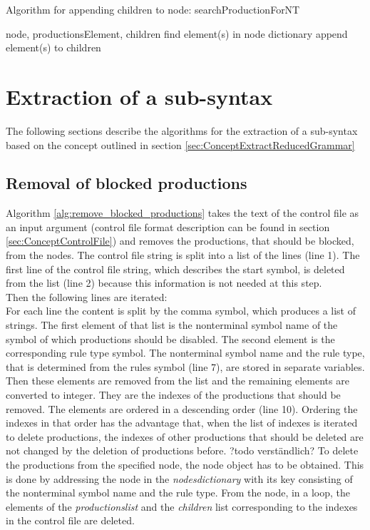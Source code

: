 \begin{algorithm}[H]
\caption{Algorithm for appending children to node: searchProductionForNT}
\begin{algorithmic}[1] 
\Require node, productionsElement, children
		\State find element(s) in node dictionary
		\State append element(s) to children
	\EndIf
\EndFor
\end{algorithmic}
\end{algorithm}

\section{Extraction of a sub-syntax}\label{sec:ImplementationExtractReducedGrammar}
The following sections describe the algorithms for the extraction of a sub-syntax based on the concept outlined in section \ref{sec:ConceptExtractReducedGrammar}

\subsection{Removal of blocked productions}
Algorithm \ref{alg:remove_blocked_productions} takes the text of the control file as an input argument (control file format description can be found in section \ref{sec:ConceptControlFile}) and removes the productions, that should be blocked, from the nodes.  
The control file string is split into a list of the lines (line 1).
The first line of the control file string, which describes the start symbol, is deleted from the list (line 2) because this information is not needed at this step.\\
Then the following lines are iterated:\\
For each line the content is split by the comma symbol, which produces a list of strings.
The first element of that list is the nonterminal symbol name of the symbol of which productions should be disabled.
The second element is the corresponding rule type symbol.
The nonterminal symbol name and the rule type, that is determined from the rules symbol (line 7), are stored in separate variables.
Then these elements are removed from the list and the remaining elements are converted to integer.
They are the indexes of the productions that should be removed.
The elements are ordered in a descending order (line 10).
Ordering the indexes in that order has the advantage that, when the list of indexes is iterated to delete productions, the indexes of other productions that should be deleted are not changed by the deletion of productions before. ?todo verständlich?
To delete the productions from the specified node, the node object has to be obtained.
This is done by addressing the node in the \textit{nodes\textunderscore dictionary} with its key consisting of the nonterminal symbol name and the rule type.
From the node, in a loop, the elements of the \textit{productions\textunderscore list} and the \textit{children} list corresponding to the indexes in the control file are deleted.

